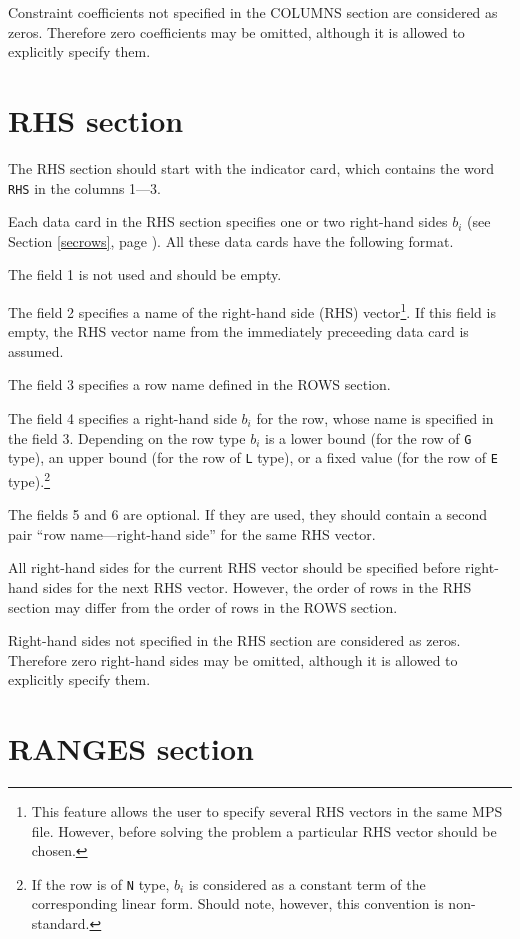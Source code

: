 Constraint coefficients not specified in the COLUMNS section are
considered as zeros. Therefore zero coefficients may be omitted,
although it is allowed to explicitly specify them.

\section{RHS section}

The RHS section should start with the indicator card, which contains the
word \verb|RHS| in the columns 1---3.

Each data card in the RHS section specifies one or two right-hand sides
$b_i$ (see Section \ref{secrows}, page \pageref{secrows}). All these
data cards have the following format.

The field 1 is not used and should be empty.

The field 2 specifies a name of the right-hand side (RHS)
vector\footnote{This feature allows the user to specify several RHS
vectors in the same MPS file. However, before solving the problem a
particular RHS vector should be chosen.}. If this field is empty, the
RHS vector name from the immediately preceeding data card is assumed.

The field 3 specifies a row name defined in the ROWS section.

The field 4 specifies a right-hand side $b_i$ for the row, whose name is
specified in the field 3. Depending on the row type $b_i$ is a lower
bound (for the row of \verb|G| type), an upper bound (for the row of
\verb|L| type), or a fixed value (for the row of \verb|E|
type).\footnote{If the row is of {\tt N} type, $b_i$ is considered as
a constant term of the corresponding linear form. Should note, however,
this convention is non-standard.}

The fields 5 and 6 are optional. If they are used, they should contain
a second pair ``row name---right-hand side'' for the same RHS vector.

All right-hand sides for the current RHS vector should be specified
before right-hand sides for the next RHS vector. However, the order of
rows in the RHS section may differ from the order of rows in the ROWS
section.

Right-hand sides not specified in the RHS section are considered as
zeros. Therefore zero right-hand sides may be omitted, although it is
allowed to explicitly specify them.

\section{RANGES section}

